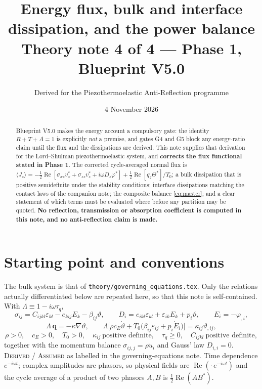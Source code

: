 \documentclass[11pt]{article}
\title{Energy flux, bulk and interface dissipation, and the power balance\\
\large Theory note 4 of 4 --- Phase 1, Blueprint V5.0}
\author{Derived for the Piezothermoelastic Anti-Reflection programme}
\date{4 November 2026}
\newcommand{\s}{\sigma}
\newcommand{\eps}{\varepsilon}
\newcommand{\bth}{\vartheta}
\newcommand{\bq}{\bm{q}}
\newcommand{\Lam}{\Lambda}
\theoremstyle{plain}
\begin{document}
\maketitle

\begin{abstract}
Blueprint V5.0 makes the energy account a compulsory gate: the identity
$R+T+A=1$ is explicitly \emph{not} a premise, and gates G4 and G5 block any
energy-ratio claim until the flux and the dissipations are derived. This note
supplies that derivation for the Lord--Shulman piezothermoelastic system, and
\textbf{corrects the flux functional stated in Phase 1}. The corrected
cycle-averaged normal flux is
$\langle J_z\rangle = -\tfrac12\operatorname{Re}[\s_{xz}v_x^* + \s_{zz}v_z^* +
i\omega D_z\varphi^*] + \tfrac12\operatorname{Re}[q_z\Theta^*]/T_0$; a bulk
dissipation that
is positive semidefinite under the stability conditions; interface dissipations
matching the contact laws of the companion note; the composite balance
\eqref{eq:master}; and a clear statement of which terms must be evaluated where
before any partition may be quoted. \textbf{No reflection, transmission or
absorption coefficient is computed in this note, and no anti-reflection claim is
made.}
\end{abstract}

\section{Starting point and conventions}
\label{sec:start}

The bulk system is that of \texttt{theory/governing\_equations.tex}. Only the
relations actually differentiated below are repeated here, so that this note is
self-contained. With $\Lam \equiv 1-i\omega\tau_q$,
\begin{equation}
  \s_{ij} = C_{ijkl}\eps_{kl} - e_{kij}E_k - \beta_{ij}\bth, \qquad
  D_i = e_{ikl}\eps_{kl} + \eps_{ik}E_k + p_i\bth, \qquad
  E_i = -\varphi_{,i},
  \label{eq:constitutive}
\end{equation}
\begin{equation}
  \Lam\,\bq = -\kappa\nabla\bth, \qquad
  \Lam\Big[\rho c_E\dot\bth + T_0\big(\beta_{ij}\dot\eps_{ij} + p_i\dot E_i\big)\Big]
  = \kappa_{ij}\bth_{,ij},
  \label{eq:fluxlaw}
\end{equation}
\begin{equation}
  \rho>0,\quad c_E>0,\quad T_0>0,\quad \kappa_{ij}\ \text{positive definite},\quad
  \tau_q\ge 0,\quad C_{ijkl}\ \text{positive definite},
  \label{eq:thermal-stability}
\end{equation}
together with the momentum balance $\s_{ij,j}=\rho\ddot u_i$ and Gauss'
law $D_{i,i}=0$. \textsc{Derived} / \textsc{Assumed} as labelled in the
governing-equations note. Time dependence $e^{-i\omega t}$; complex amplitudes are
phasors, so physical fields are $\operatorname{Re}(\cdot\,e^{-i\omega t})$ and the
cycle average of a product of two phasors $A,B$ is
$\tfrac12\operatorname{Re}(A B^*)$.
\end{document}
